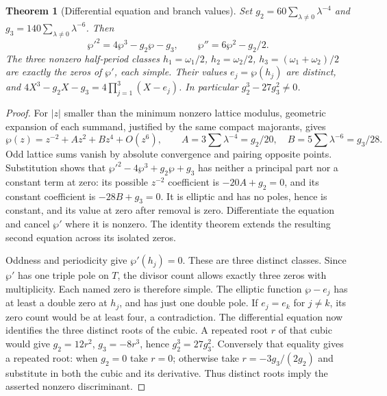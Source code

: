 \documentclass[11pt,a4paper,openany]{book}
\newtheorem{theorem}{Theorem}[chapter]
\theoremstyle{definition}
\theoremstyle{remark}\newtheorem{remark}[theorem]{Remark}
\newcommand{\family}[1]{}
\begin{document}
\begin{theorem}[Differential equation and branch values]\label{d12:22-06}\family{D12.22.06}
Set $g_2=60\sum_{\lambda\ne0}\lambda^{-4}$ and
$g_3=140\sum_{\lambda\ne0}\lambda^{-6}$. Then
\[
                \wp'^2=4\wp^3-g_2\wp-g_3,\qquad
                \wp''=6\wp^2-g_2/2.
\]
The three nonzero half-period classes $h_1=\omega_1/2$,
$h_2=\omega_2/2$, $h_3=(\omega_1+\omega_2)/2$ are exactly the
zeros of $\wp'$, each simple. Their values $e_j=\wp(h_j)$ are distinct,
and $4X^3-g_2X-g_3=4\prod_{j=1}^3(X-e_j)$. In particular
$g_2^3-27g_3^2\ne0$.
\end{theorem}
\begin{proof}
For $|z|$ smaller than the minimum nonzero lattice modulus, geometric
expansion of each summand, justified by the same compact majorants,
gives
\[
 \wp(z)=z^{-2}+A z^2+Bz^4+O(z^6),\qquad
       A=3\sum\lambda^{-4}=g_2/20,\quad B=5\sum\lambda^{-6}=g_3/28.
\]
Odd lattice sums vanish by absolute convergence and pairing opposite
points. Substitution shows that
$\wp'^2-4\wp^3+g_2\wp+g_3$ has neither a principal part nor a
constant term at zero: its possible $z^{-2}$ coefficient is
$-20A+g_2=0$, and its constant coefficient is $-28B+g_3=0$.
It is elliptic and has no poles, hence is constant, and its value at
zero after removal is zero. Differentiate the equation and cancel
$\wp'$ where it is nonzero. The identity theorem extends the resulting
second equation across its isolated zeros.

Oddness and periodicity give $\wp'(h_j)=0$. These are three distinct
classes. Since $\wp'$ has one triple pole on $T$, the divisor count
allows exactly three zeros with multiplicity. Each named zero is
therefore simple. The elliptic function $\wp-e_j$ has at least a
double zero at $h_j$, and has just one double pole. If $e_j=e_k$ for
$j\ne k$, its zero count would be at least four, a contradiction.
The differential equation now identifies the three distinct roots of
the cubic. A repeated root $r$ of that cubic would give
$g_2=12r^2$, $g_3=-8r^3$, hence $g_2^3=27g_3^2$.
Conversely that equality gives a repeated root: when $g_2=0$ take
$r=0$; otherwise take $r=-3g_3/(2g_2)$ and substitute in both the
cubic and its derivative. Thus distinct roots imply the asserted
nonzero discriminant.
\end{proof}
\end{document}

